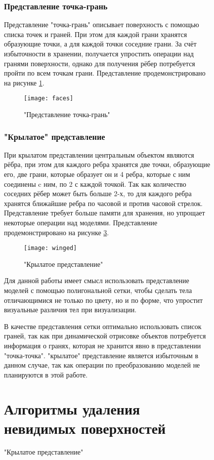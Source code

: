 \begin{figure}[h]
\subsubsection{Представление точка-грань}
Представление "точка-грань" описывает поверхность с помощью списка точек и граней. При этом для каждой грани хранятся образующие точки, а для каждой точки соседние грани. За счёт избыточности в хранении, получается упростить операции над гранями поверхности, однако для получения рёбер потребуется пройти по всем точкам грани. Представление продемонстрировано на рисунке \ref{fig:vertex-face}.

\begin{figure}[h]
	\centering
	\texttt{[image: faces]}
	\caption{"Представление точка-грань"}
	\label{fig:vertex-face}
\end{figure}

\subsubsection{"Крылатое" представление}
При крылатом представлении центральным объектом являются рёбра, при этом для каждого ребра хранятся две точки, образующие его, две грани, которые образует он и 4 ребра, которые с ним соединены c ним, по 2 с каждой точкой. Так как количество соседних рёбер может быть больше 2-х, то для каждого ребра хранятся ближайшие ребра по часовой и против часовой стрелок.
Представление требует больше памяти для хранения, но упрощает некоторые операции над моделями.
Представление продемонстрировано на рисунке \ref{fig:winged}.

\begin{figure}[h]
	\centering
	\texttt{[image: winged]}
	\caption{"Крылатое представление"}
	\label{fig:winged}
\end{figure}


Для данной работы имеет смысл использовать представление моделей с помощью полигональной сетки, чтобы сделать тела отличающимися не только по цвету, но и по форме, что упростит визуальные различия тел при визуализации.

В качестве представления сетки оптимально использовать список граней, так как при динамической отрисовке объектов потребуется информация о гранях, которая не хранится явно в представлении "точка-точка". "крылатое"  представление является избыточным в данном случае, так как операции по преобразованию моделей не планируются в этой работе.

\section{Алгоритмы удаления невидимых поверхностей}


\end{figure}
